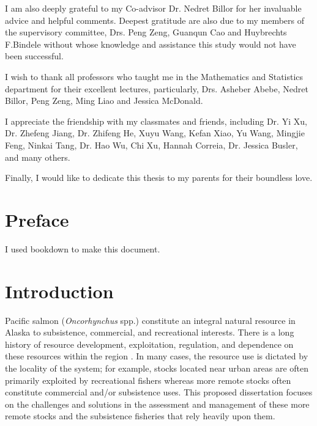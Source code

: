\documentclass[12pt,]{book}
\theoremstyle{definition}
\theoremstyle{definition}
\theoremstyle{definition}
\theoremstyle{remark}
\begin{document}
\begin{romanpages}
\begin{acknowledgments}
I am also deeply grateful to my Co-advisor Dr. Nedret Billor for her invaluable advice and helpful comments. Deepest gratitude are also due to my members of the supervisory committee, Drs. Peng Zeng, Guanqun Cao and Huybrechts F.Bindele without whose knowledge and assistance this study would not have been successful.

I wish to thank all professors who taught me in the Mathematics and Statistics department for their excellent lectures, particularly, Drs. Asheber Abebe, Nedret Billor, Peng Zeng, Ming Liao and Jessica McDonald.

I appreciate the friendship with my classmates and friends, including Dr. Yi Xu, Dr. Zhefeng Jiang, Dr. Zhifeng He, Xuyu Wang, Kefan Xiao, Yu Wang, Mingjie Feng, Ninkai Tang, Dr. Hao Wu, Chi Xu, Hannah Correia, Dr. Jessica Busler, and many others. 

Finally, I would like to dedicate this thesis to my parents for their boundless love.
\end{acknowledgments}

\begin{singlespace}
	\tableofcontents
	\clearpage
	\listoffigures
	\clearpage
	\listoftables
\end{singlespace}

\end{romanpages}        %

\normalem       %

\doublespacing

\chapter*{Preface}\label{preface}

I used bookdown \citep{xie-2015} to make this document.

\chapter{Introduction}\label{ch1}

Pacific salmon (\emph{Oncorhynchus} spp.) constitute an integral natural
resource in Alaska to subsistence, commercial, and recreational
interests. There is a long history of resource development,
exploitation, regulation, and dependence on these resources within the
region \citep{cooley-1963}. In many cases, the resource use is dictated
by the locality of the system; for example, stocks located near urban
areas are often primarily exploited by recreational fishers whereas more
remote stocks often constitute commercial and/or subsistence uses. This
proposed dissertation focuses on the challenges and solutions in the
assessment and management of these more remote stocks and the
subsistence fisheries that rely heavily upon them.
\end{document}
